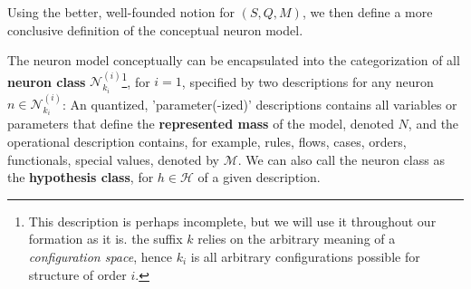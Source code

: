 Using the better, well-founded notion for $(S,Q,M)$, we then define a more conclusive definition of the conceptual neuron model. 
\begin{definition}
    The neuron model conceptually can be encapsulated into the categorization of all \textbf{neuron class} $\mathcal{N}_{k_{i}}^{(i)}$\footnote{This description is perhaps incomplete, but we will use it throughout our formation as it is. the suffix $k$ relies on the arbitrary meaning of a \textit{configuration space}, hence $k_i$ is all arbitrary configurations possible for structure of order $i$.}, for $i=1$, specified by two descriptions for any neuron $n\in \mathcal{N}_{k_{i}}^{(i)}$: An quantized, 'parameter(-ized)' descriptions contains all variables or parameters that define the \textbf{represented mass} of the model, denoted $N$, and the operational description contains, for example, rules, flows, cases, orders, functionals, special values, denoted by $\mathcal{M}$. We can also call the neuron class as the \textbf{hypothesis class}, for $h\in \mathcal{H}$ of a given description.
\end{definition}

